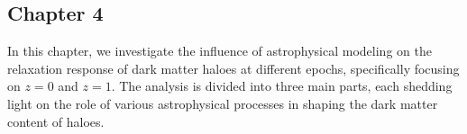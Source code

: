 \documentclass[a4paper, 12pt, oneside]{Thesis}  %
\begin{document}





\subsection*{Chapter 4}

In this chapter, we investigate the influence of astrophysical modeling on the relaxation response of dark matter haloes at different epochs, specifically focusing on \( z=0 \) and \( z=1 \). The analysis is divided into three main parts, each shedding light on the role of various astrophysical processes in shaping the dark matter content of haloes.
\end{document}
